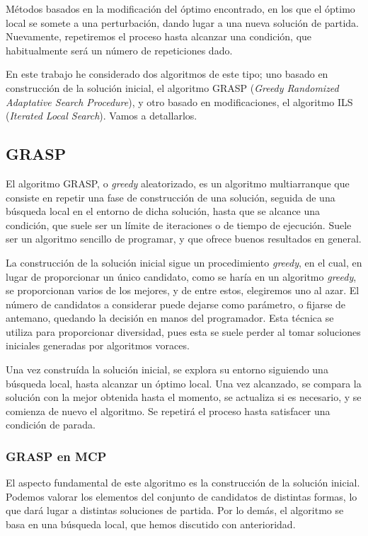 Métodos basados en la modificación del óptimo encontrado, en los que el óptimo local se somete
a una perturbación, dando lugar a una nueva solución de partida. Nuevamente, repetiremos el
proceso hasta alcanzar una condición, que habitualmente será un número de repeticiones dado.

En este trabajo he considerado dos algoritmos de este tipo; uno basado en construcción de la solución
inicial, el algoritmo GRASP (\textit{Greedy Randomized Adaptative Search Procedure}), y otro basado
en modificaciones, el algoritmo ILS (\textit{Iterated Local Search}). Vamos a detallarlos.

\subsection{GRASP}

El algoritmo GRASP, o \textit{greedy} aleatorizado, es un algoritmo multiarranque que consiste en repetir
una fase de construcción de una solución, seguida de una búsqueda local en el entorno de dicha solución,
hasta que se alcance una condición, que suele ser un límite de iteraciones o de tiempo de ejecución.
Suele ser un algoritmo sencillo de programar, y que ofrece buenos resultados en general.

La construcción de la solución inicial sigue un procedimiento \textit{greedy}, en el cual, en lugar de
proporcionar un único candidato, como se haría en un algoritmo \textit{greedy}, se proporcionan
varios de los mejores, y de entre estos, elegiremos uno al azar. El número de candidatos a considerar
puede dejarse como parámetro, o fijarse de antemano, quedando la decisión en manos del programador.
Esta técnica se utiliza para proporcionar diversidad, pues esta se suele perder al tomar soluciones iniciales
generadas por algoritmos voraces.

Una vez construída la solución inicial, se explora su entorno siguiendo una búsqueda local, hasta alcanzar
un óptimo local. Una vez alcanzado, se compara la solución con la mejor obtenida hasta el momento, se
actualiza si es necesario, y se comienza de nuevo el algoritmo. Se repetirá el proceso hasta satisfacer
una condición de parada.

\subsubsection{GRASP en MCP}

El aspecto fundamental de este algoritmo es la construcción de la solución inicial. Podemos valorar
los elementos del conjunto de candidatos de distintas formas, lo que dará lugar a distintas soluciones
de partida. Por lo demás, el algoritmo se basa en una búsqueda local, que hemos discutido con anterioridad.

